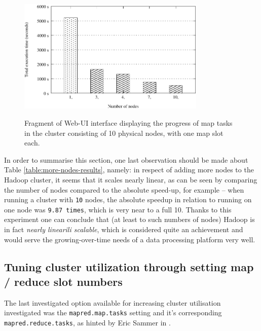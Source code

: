 \begin{figure}[ch!]
  \centering
  \includegraphics[width=0.80\textwidth]{img/hadoop/nodes-perf.pdf}
  \label{fig:nodes-pers-graph}
  \caption{Fragment of Web-UI interface displaying the progress of map tasks in the cluster consisting of 10 physical nodes, with one map slot each.}
\end{figure}

In order to summarise this section, one last observation should be made about Table \ref{table:more-nodes-results}, namely: in respect of adding more nodes to the Hadoop cluster, it seems that it scales nearly linear, as can be seen by comparing the number of nodes compared to the absolute speed-up, for example -- when running a cluster with \verb|10| nodes, the absolute speedup in relation to running on one node was \verb|9.87 times|, which is very near to a full 10. Thanks to this experiment one can conclude that (at least to such numbers of nodes) Hadoop is in fact \textit{nearly linearili scalable}, which is considered quite an achievement and would serve the growing-over-time needs of a data processing platform very well.


\subsection{Tuning cluster utilization through setting map / reduce slot numbers}
\label{sec:tuning-cluster-utilisation}
The last investigated option available for increasing cluster utilisation investigated was the \verb|mapred.map.tasks| setting and it's corresponding \verb|mapred.reduce.tasks|, as hinted by Eric Sammer in \cite{hadoop-ops}.


